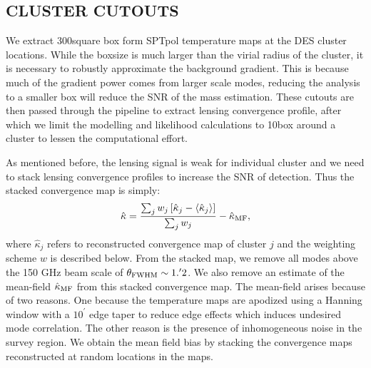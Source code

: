  \subsection{CLUSTER CUTOUTS} %
 

 
\label{sec:cluster_cutouts}
 We extract 300\arcmin  square box form SPTpol temperature maps at the DES cluster locations. 
While the boxsize is much larger than the virial radius of the cluster, it is necessary to robustly approximate the background gradient. 
This is because much of the gradient power comes from larger scale modes, reducing the analysis to a smaller box will reduce the SNR of the mass estimation. 
These cutouts are then passed through the pipeline to extract lensing convergence profile, after which we limit the modelling and likelihood calculations to 10\arcmin box around a cluster to lessen the computational effort.

As mentioned before, the lensing signal is weak for individual cluster and we need to stack lensing convergence profiles to increase the SNR of detection.
 Thus the stacked convergence map is simply: 
 \begin{equation}
 \hat{\kappa} = \frac{\sum_j  w_j \left[ \hat{\kappa}_{j} - \left< \hat{\kappa}_{j} \right> \right]}{\sum_j w_j} - \hat{\kappa}_{\rm MF},
 \end{equation}
 where $\hat{\kappa}_{j}$ refers to reconstructed convergence map of cluster $j$ %
 and the weighting scheme $w$ is described below.
From the stacked map, we remove all modes above the \sptpol{} 150 GHz beam scale of $\theta_{\rm FWHM}\sim 1.^{\prime}2$. 
We also remove an estimate of the mean-field $\hat{\kappa}_{\rm MF}$ from this stacked convergence map.
The mean-field arises because of two reasons.
One because the temperature maps are apodized using a Hanning window with a $10^{\prime}$ edge taper to reduce edge effects which induces undesired mode correlation.
The other reason is the presence of inhomogeneous noise in the survey region.
We obtain the mean field bias by stacking the convergence maps reconstructed at \howmanyrandomsforMF{} random locations in the maps. 


